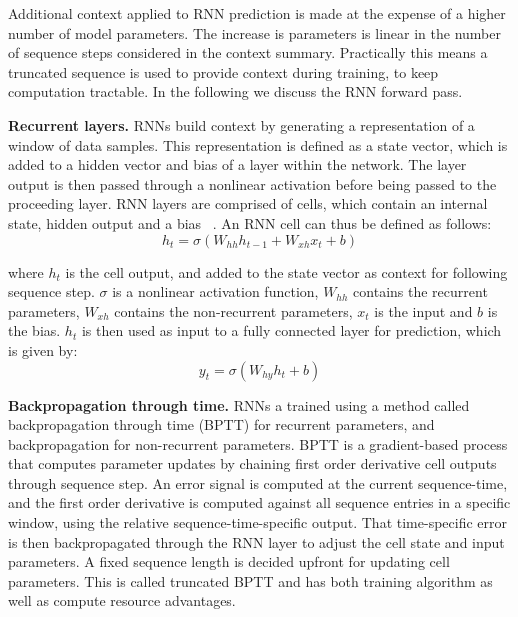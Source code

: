 \noindent Additional context applied to RNN prediction is made at the expense of a higher number of model parameters. The increase is parameters is linear in the number of sequence steps considered in the context summary. Practically this means a truncated sequence is used to provide context during training, to keep computation tractable. In the following we discuss the RNN forward pass. \par

\noindent \textbf{Recurrent layers.} RNNs build context by generating a representation of a window of data samples. This representation is defined as a state vector, which is added to a hidden vector and bias of a layer within the network. The layer output is then passed through a nonlinear activation before being passed to the proceeding layer. RNN layers are comprised of cells, which contain an internal state, hidden output and a bias \unskip ~\citep{DLIndaba2018}. An RNN cell can thus be defined as follows: 
\begin{equation}
	h_t = \sigma(W_{hh}h_{t-1} + W_{xh}x_t + b)
\end{equation}

\noindent where $h_t$ is the cell output, and added to the state vector as context for following sequence step. $\sigma$ is a nonlinear activation function, $W_{hh}$ contains the recurrent parameters, $W_{xh}$ contains the non-recurrent parameters, $x_t$ is the input and $b$ is the bias. $h_t$ is then used as input to a fully connected layer for prediction, which is given by:
\begin{equation}
	y_t = \sigma(W_{hy}h_{t} + b)
\end{equation}

\noindent \textbf{Backpropagation through time.} RNNs a trained using a method called backpropagation through time (BPTT) for recurrent parameters, and backpropagation for non-recurrent parameters. BPTT is a gradient-based process that computes parameter updates by chaining first order derivative cell outputs through sequence step. An error signal is computed at the current sequence-time, and the first order derivative is computed against all sequence entries in a specific window, using the relative sequence-time-specific output. That time-specific error is then backpropagated through the RNN layer to adjust the cell state and input parameters. A fixed sequence length is decided upfront for updating cell parameters. This is called truncated BPTT and has both training algorithm as well as compute resource advantages. \par

